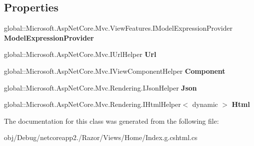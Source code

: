 \subsection*{Properties}
\begin{DoxyCompactItemize}
\item 
\mbox{\label{class_asp_net_core_1_1_views___home___index_a1c12fddbab3a154a62b2a730eee55181}} 
global\+::\+Microsoft.\+Asp\+Net\+Core.\+Mvc.\+View\+Features.\+I\+Model\+Expression\+Provider {\bfseries Model\+Expression\+Provider}
\item 
\mbox{\label{class_asp_net_core_1_1_views___home___index_a49920e11fc6a3866a9362b0760f02473}} 
global\+::\+Microsoft.\+Asp\+Net\+Core.\+Mvc.\+I\+Url\+Helper {\bfseries Url}
\item 
\mbox{\label{class_asp_net_core_1_1_views___home___index_adb326987c09e7039ba39bfd6ddc92fb5}} 
global\+::\+Microsoft.\+Asp\+Net\+Core.\+Mvc.\+I\+View\+Component\+Helper {\bfseries Component}
\item 
\mbox{\label{class_asp_net_core_1_1_views___home___index_aef8cb8ae3a2a3dc735b580b6a6c0176d}} 
global\+::\+Microsoft.\+Asp\+Net\+Core.\+Mvc.\+Rendering.\+I\+Json\+Helper {\bfseries Json}
\item 
\mbox{\label{class_asp_net_core_1_1_views___home___index_aafaaf261e7ac319bee91aa0f369c4f72}} 
global\+::\+Microsoft.\+Asp\+Net\+Core.\+Mvc.\+Rendering.\+I\+Html\+Helper$<$ dynamic $>$ {\bfseries Html}
\end{DoxyCompactItemize}


The documentation for this class was generated from the following file\+:\begin{DoxyCompactItemize}
\item 
obj/\+Debug/netcoreapp2./\+Razor/\+Views/\+Home/Index.\+g.\+cshtml.\+cs\end{DoxyCompactItemize}
